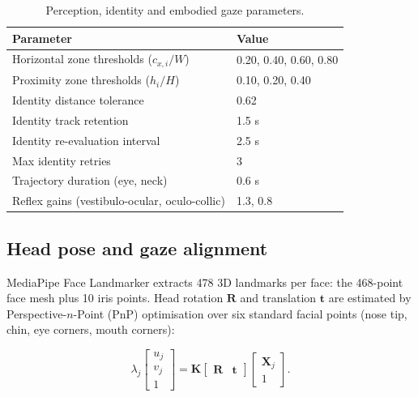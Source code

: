 \begin{table}[tbp]
    \centering
    \small
    \caption{Perception, identity and embodied gaze parameters.}
    \label{tab:perception-gaze-parameters}
    \begin{tabular}{@{}ll@{}}
        \toprule
        \textbf{Parameter} & \textbf{Value} \\
        \midrule
        Horizontal zone thresholds ($c_{x,i}/W$) & 0.20, 0.40, 0.60, 0.80 \\
        Proximity zone thresholds ($h_i/H$) & 0.10, 0.20, 0.40 \\
        Identity distance tolerance & 0.62 \\
        Identity track retention & 1.5 s \\
        Identity re-evaluation interval & 2.5 s \\
        Max identity retries & 3 \\
        Trajectory duration (eye, neck) & 0.6 s \\
        Reflex gains (vestibulo-ocular, oculo-collic) & 1.3, 0.8 \\
        \bottomrule
    \end{tabular}
\end{table}

\subsection{Head pose and gaze alignment}
\label{subsec:head-pose-gaze}

MediaPipe Face Landmarker extracts 478 3D landmarks per face: the 468-point face mesh plus 10 iris points. Head rotation $\mathbf{R}$ and translation $\mathbf{t}$ are estimated by Perspective-$n$-Point (PnP) optimisation over six standard facial points (nose tip, chin, eye corners, mouth corners):

\begin{equation}
    \lambda_j
    \begin{bmatrix}
        u_j\\v_j\\1
    \end{bmatrix}
    =
    \mathbf{K}
    \begin{bmatrix}
        \mathbf{R} & \mathbf{t}
    \end{bmatrix}
    \begin{bmatrix}
        \mathbf{X}_j\\1
    \end{bmatrix}.
    \label{eq:pnp-relation}
\end{equation}

